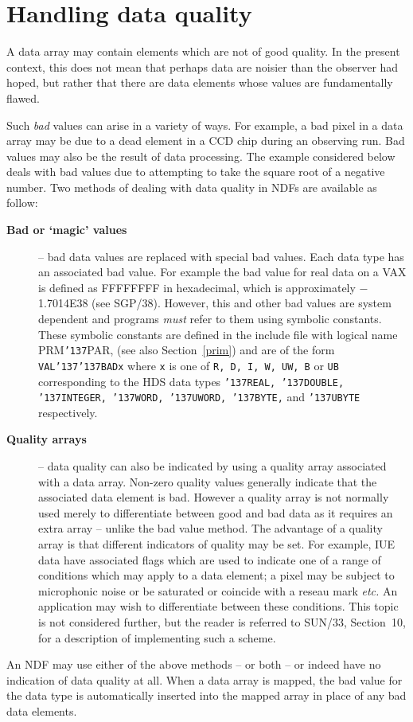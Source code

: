 \documentclass[twoside,11pt]{article}
\renewcommand{\_}{{\tt\char'137}}
\newcommand{\xref}[3]{#1}
\newcommand{\xlabel}[1]{}
\begin{document}
\newpage
\section{Handling data quality\label{badpix}\xlabel{handling_data_quality}}

A data array may contain elements which are not of good quality.
In the present context, this does not mean that perhaps data are noisier than 
the observer had hoped, 
but rather that there are data elements whose values are fundamentally 
flawed.

Such {\sl bad\/} values can arise in a variety of ways.
For example, a bad pixel in a  data array may be due to a dead element 
in a CCD chip during an observing run.
Bad values may also be the result of data processing. 
The example considered below deals with bad values due to
attempting to take the square root of a negative number.
Two methods of dealing with data quality in NDFs are 
available as follow:
\begin{description}
\item[{\bf Bad or `magic' values}] -- bad data values are replaced with special 
bad values. Each data type has an associated bad value. For example
the bad value for real data on a VAX is defined as
FFFFFFFF in hexadecimal,  which is approximately  $-$1.7014E38
(see \xref{SGP/38}{sgp38}{}).
However, this and other bad values are system 
dependent and programs {\sl must\/} refer to them using symbolic 
constants. These symbolic constants are defined in the include file with 
logical name PRM\_PAR, (see also Section~\ref{prim}) and are of the form {\tt VAL\_\_BADx} where {\tt x} 
is one of {\tt R, D, I, W, UW, B} or {\tt UB}  corresponding to the 
HDS data types {\tt \_REAL,
\_DOUBLE, \_INTEGER, \_WORD, \_UWORD, \_BYTE,} and {\tt\_UBYTE} respectively.
\item[{\bf Quality arrays}] -- data quality can also be indicated by
using a quality array associated with a data array.
Non-zero quality values generally indicate that the 
associated data element is bad.
However a quality array is not normally used merely to 
differentiate between good 
and bad data as it requires an extra array -- unlike the bad value method.
The advantage of a quality array is that different indicators of 
quality may be set. For example, IUE data have associated flags which 
are used to indicate one of a range of conditions which may apply to a
data element; a pixel may be subject to microphonic noise 
or be saturated or coincide with a reseau mark {\it etc.}
An application may wish to differentiate between these conditions.
This topic is not considered further, but the reader is referred to
\xref{SUN/33}{sun33}{},
Section~10, for a description of implementing such a scheme.
\end{description}
An NDF may use either of the above methods -- or both  -- or indeed 
have no indication of data quality at all. 
When a data array is mapped,
the bad value for the data type 
is automatically inserted into the mapped array in place of any
bad data elements. 
\end{document}
